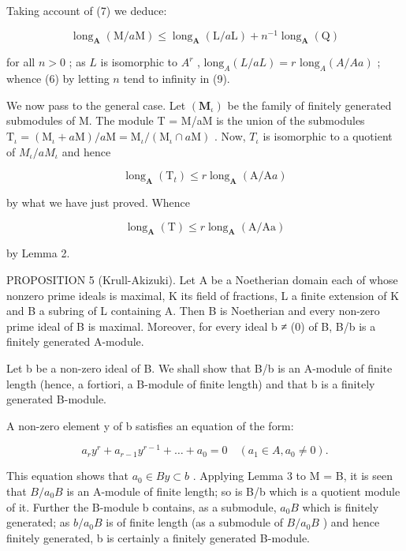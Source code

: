 Taking account of (7) we deduce:

\[
\operatorname{long} _ {\mathbf {A}} (\mathrm{M} / a \mathrm{M}) \leqslant \operatorname{long} _ {\mathbf {A}} (\mathrm{L} / a \mathrm{L}) + n ^ {- 1} \operatorname{long} _ {\mathbf {A}} (\mathrm{Q})\tag{9}
\]

for all \(n > 0\) ; as \(L\) is isomorphic to \(A^r\) , \(\text{long}_A(L/aL) = r \text{ long}_A(A/Aa)\) ; whence (6) by letting \(n\) tend to infinity in (9).

We now pass to the general case. Let \((\mathbf{M}_{\iota})\) be the family of finitely generated submodules of M. The module T = M/aM is the union of the submodules \(\mathrm{T}_{\iota} = (\mathrm{M}_{\iota} + a\mathrm{M})/a\mathrm{M} = \mathrm{M}_{\iota}/(\mathrm{M}_{\iota} \cap a\mathrm{M})\) . Now, \(T_{\iota}\) is isomorphic to a quotient of \(M_{\iota}/aM_{\iota}\) and hence

\[
\operatorname{long} _ {\mathbf {A}} \left(\mathrm{T} _ {t}\right) \leqslant r \operatorname{long} _ {\mathbf {A}} (\mathrm{A} / \mathrm{A} a)
\]

by what we have just proved. Whence

\[
\operatorname{long} _ {\mathbf {A}} (\mathrm{T}) \leqslant r \operatorname{long} _ {\mathbf {A}} (\mathrm{A/Aa})
\]

by Lemma 2.

PROPOSITION 5 (Krull-Akizuki). Let A be a Noetherian domain each of whose nonzero prime ideals is maximal, K its field of fractions, L a finite extension of K and B a subring of L containing A. Then B is Noetherian and every non-zero prime ideal of B is maximal. Moreover, for every ideal b ≠ (0) of B, B/b is a finitely generated A-module.

Let b be a non-zero ideal of B. We shall show that B/b is an A-module of finite length (hence, a fortiori, a B-module of finite length) and that b is a finitely generated B-module.

A non-zero element y of b satisfies an equation of the form:

\[
a _ {r} y ^ {r} + a _ {r - 1} y ^ {r - 1} + \dots + a _ {0} = 0 \quad (a _ {1} \in A, a _ {0} \neq 0).
\]

This equation shows that \(a_{0} \in By \subset b\) . Applying Lemma 3 to M = B, it is seen that \(B/a_{0}B\) is an A-module of finite length; so is B/b which is a quotient module of it. Further the B-module b contains, as a submodule, \(a_{0}B\) which is finitely generated; as \(b/a_{0}B\) is of finite length (as a submodule of \(B/a_{0}B\) ) and hence finitely generated, b is certainly a finitely generated B-module.

